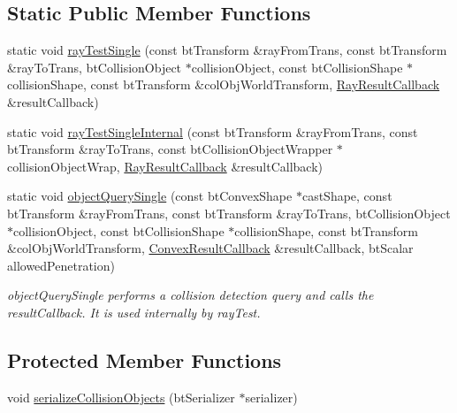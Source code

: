 \subsection*{Static Public Member Functions}
\begin{CompactItemize}
\item 
static void \hyperlink{classbt_collision_world_ca2a9413508b4a2449fe83ff93ea564e}{rayTestSingle} (const btTransform \&rayFromTrans, const btTransform \&rayToTrans, btCollisionObject $\ast$collisionObject, const btCollisionShape $\ast$collisionShape, const btTransform \&colObjWorldTransform, \hyperlink{structbt_collision_world_1_1_ray_result_callback}{RayResultCallback} \&resultCallback)
\item 
static void \hyperlink{classbt_collision_world_84bbeea09de9dc5c68e49826e58f7114}{rayTestSingleInternal} (const btTransform \&rayFromTrans, const btTransform \&rayToTrans, const btCollisionObjectWrapper $\ast$collisionObjectWrap, \hyperlink{structbt_collision_world_1_1_ray_result_callback}{RayResultCallback} \&resultCallback)
\item 
\hypertarget{classbt_collision_world_a63de55ff9451a80c8c825cafd64d9ba}{
static void \hyperlink{classbt_collision_world_a63de55ff9451a80c8c825cafd64d9ba}{objectQuerySingle} (const btConvexShape $\ast$castShape, const btTransform \&rayFromTrans, const btTransform \&rayToTrans, btCollisionObject $\ast$collisionObject, const btCollisionShape $\ast$collisionShape, const btTransform \&colObjWorldTransform, \hyperlink{structbt_collision_world_1_1_convex_result_callback}{ConvexResultCallback} \&resultCallback, btScalar allowedPenetration)}
\label{classbt_collision_world_a63de55ff9451a80c8c825cafd64d9ba}

\begin{CompactList}\small\item\em objectQuerySingle performs a collision detection query and calls the resultCallback. It is used internally by rayTest. \item\end{CompactList}\end{CompactItemize}
\subsection*{Protected Member Functions}
\begin{CompactItemize}
\item 
void \hyperlink{classbt_collision_world_eed5861d66035fa72f40e27b04bdc056}{serializeCollisionObjects} (btSerializer $\ast$serializer)
\end{CompactItemize}

